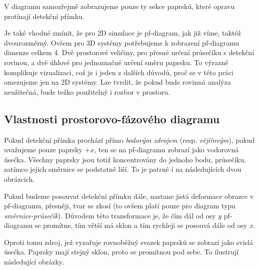 V diagramu samozřejmě zobrazujeme pouze ty sekce paprsků, které opravu protínají detekční přímku.

Je také vhodné zmínit, že pro 2D simulace je pf-diagram, jak již víme, taktéž dvourozměrný. Ovšem pro 3D systémy potřebujeme k zobrazení pf-diagramu dimenze celkem 4. Dvě prostorové veličiny, pro přesné určení průsečíku s detekční rovinou, a dvě úhlové pro jednoznačné určení směru paprsku. To výrazně komplikuje vizualizaci, což je i jeden z dalších důvodů, proč se v této práci omezujeme jen na 2D systémy. Lze tvrdit, že pokud bude rovinná analýza neužitečná, bude težko použitelný i rozbor v prostoru.


\subsection{Vlastnosti prostorovo-fázového diagramu}

Pokud detekční přímka prochází přímo \emph{bodovým zdrojem} (resp. \emph{vějířovým}), pokud uvažujeme pouze paprsky $+x$, ten se na pf-diagramu zobrazí jako vodorovná úsečka. Všechny paprsky jsou totiž koncentrovány do jednoho bodu, průsečíku, zatímco jejich směrnice se podstatně liší. To je patrné i na následujících dvou obrázcích.


Pokud budeme posouvat detekční přímku dále, nastane jistá deformace obrazce v pf-diagramu, přesněji, tvar se zkosí (to ovšem platí pouze pro diagram typu \emph{směrnice-průsečík}). Důvodem této transformace je, že čím dál od osy $y$ pf-diagramu se promítne, tím větší má sklon a tím rychleji se posouvá dále od osy $x$. 


Oproti tomu zdroj, jež vyzařuje rovnoběžný svazek paprsků se zobrazí jako svislá úsečka. Paprsky mají stejný sklon, proto se promítnou pod sebe. To ilustrují následující obrázky.

